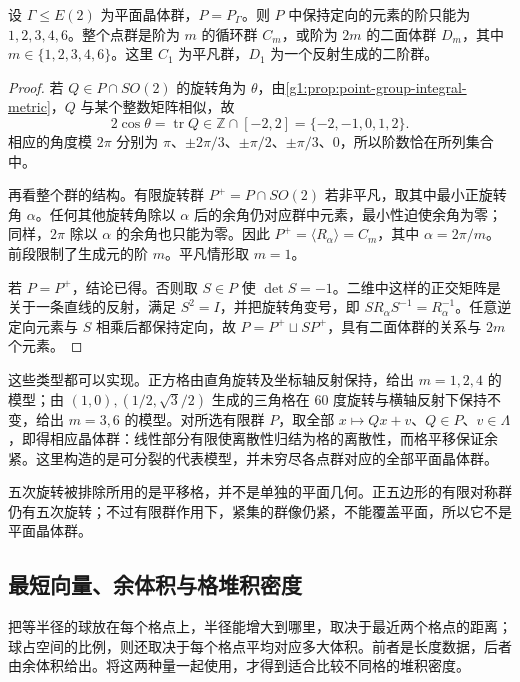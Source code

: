 \begin{theorem}
	\label{g1:thm:planar-crystallographic-restriction}
	设 \(\Gamma\le E(2)\) 为平面晶体群，\(P=P_\Gamma\)。则 \(P\) 中保持定向的元素的阶只能为 \(1,2,3,4,6\)。整个点群是阶为 \(m\) 的循环群 \(C_m\)，或阶为 \(2m\) 的二面体群 \(D_m\)，其中 \(m\in\{1,2,3,4,6\}\)。这里 \(C_1\) 为平凡群，\(D_1\) 为一个反射生成的二阶群。
\end{theorem}
\begin{proof}
	若 \(Q\in P\cap SO(2)\) 的旋转角为 \(\theta\)，由\cref{g1:prop:point-group-integral-metric}，\(Q\) 与某个整数矩阵相似，故
	\[
		2\cos\theta=\operatorname{tr}Q\in\mathbb Z\cap[-2,2]=\{-2,-1,0,1,2\}.
	\]
	相应的角度模 \(2\pi\) 分别为 \(\pi\)、\(\pm2\pi/3\)、\(\pm\pi/2\)、\(\pm\pi/3\)、\(0\)，所以阶数恰在所列集合中。

	再看整个群的结构。有限旋转群 \(P^+=P\cap SO(2)\) 若非平凡，取其中最小正旋转角 \(\alpha\)。任何其他旋转角除以 \(\alpha\) 后的余角仍对应群中元素，最小性迫使余角为零；同样，\(2\pi\) 除以 \(\alpha\) 的余角也只能为零。因此 \(P^+=\langle R_\alpha\rangle=C_m\)，其中 \(\alpha=2\pi/m\)。前段限制了生成元的阶 \(m\)。平凡情形取 \(m=1\)。

	若 \(P=P^+\)，结论已得。否则取 \(S\in P\) 使 \(\det S=-1\)。二维中这样的正交矩阵是关于一条直线的反射，满足 \(S^2=I\)，并把旋转角变号，即 \(SR_\alpha S^{-1}=R_\alpha^{-1}\)。任意逆定向元素与 \(S\) 相乘后都保持定向，故 \(P=P^+\sqcup SP^+\)，具有二面体群的关系与 \(2m\) 个元素。
\end{proof}

这些类型都可以实现。正方格由直角旋转及坐标轴反射保持，给出 \(m=1,2,4\) 的模型；由 \((1,0),(1/2,\sqrt3/2)\) 生成的三角格在 \(60\) 度旋转与横轴反射下保持不变，给出 \(m=3,6\) 的模型。对所选有限群 \(P\)，取全部 \(x\mapsto Qx+v\)、\(Q\in P\)、\(v\in\Lambda\)，即得相应晶体群：线性部分有限使离散性归结为格的离散性，而格平移保证余紧。这里构造的是可分裂的代表模型，并未穷尽各点群对应的全部平面晶体群。

\ProseParagraphBreak

五次旋转被排除所用的是平移格，并不是单独的平面几何。正五边形的有限对称群仍有五次旋转；不过有限群作用下，紧集的群像仍紧，不能覆盖平面，所以它不是平面晶体群。

\subsection{最短向量、余体积与格堆积密度}
\label{g1:subsec:B04:03}

把等半径的球放在每个格点上，半径能增大到哪里，取决于最近两个格点的距离；球占空间的比例，则还取决于每个格点平均对应多大体积。前者是长度数据，后者由余体积给出。将这两种量一起使用，才得到适合比较不同格的堆积密度。

